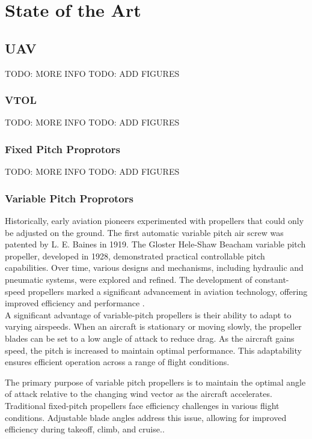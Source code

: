\chapter{State of the Art} 
\label{chap:Chapter2}
\section{UAV}
TODO: MORE INFO
TODO: ADD FIGURES
\subsection{VTOL}
TODO: MORE INFO
TODO: ADD FIGURES

\subsection{Fixed Pitch Proprotors}
TODO: MORE INFO
TODO: ADD FIGURES

\subsection{Variable Pitch Proprotors}
Historically, early aviation pioneers experimented with propellers that could only be adjusted on the ground.
The first automatic variable pitch air screw was patented by L. E. Baines in 1919.
The Gloster Hele-Shaw Beacham variable pitch propeller, developed in 1928, demonstrated practical controllable pitch capabilities.
Over time, various designs and mechanisms, including hydraulic and pneumatic systems, were explored and refined.
The development of constant-speed propellers marked a significant advancement in aviation technology, offering improved efficiency and performance \cite{VPP2}.\\

A significant advantage of variable-pitch propellers is their ability to adapt to varying airspeeds. 
When an aircraft is stationary or moving slowly, the propeller blades can be set to a low angle of attack to reduce drag. As the aircraft gains speed, the pitch is increased to maintain optimal performance. 
This adaptability ensures efficient operation across a range of flight conditions.

The primary purpose of variable pitch propellers is to maintain the optimal angle of attack relative to the changing wind vector as the aircraft accelerates.
Traditional fixed-pitch propellers face efficiency challenges in various flight conditions.
Adjustable blade angles address this issue, allowing for improved efficiency during takeoff, climb, and cruise.\cite{VPP3}.\\

